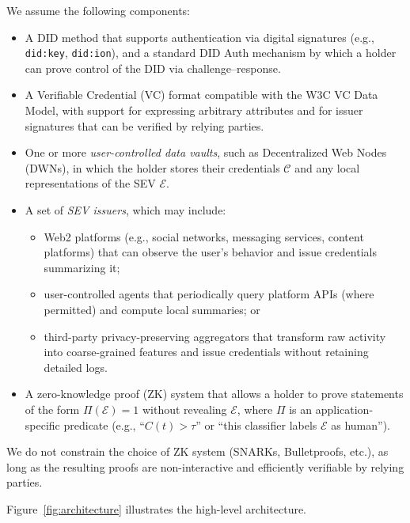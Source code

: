\documentclass[11pt]{article}
\begin{document}
We assume the following components:

\begin{itemize}
  \item A DID method that supports authentication via digital signatures (e.g., \texttt{did:key}, \texttt{did:ion}), and a standard DID Auth mechanism by which a holder can prove control of the DID via challenge--response.
  \item A Verifiable Credential (VC) format compatible with the W3C VC Data Model, with support for expressing arbitrary attributes and for issuer signatures that can be verified by relying parties.
  \item One or more \emph{user-controlled data vaults}, such as Decentralized Web Nodes (DWNs), in which the holder stores their credentials $\mathcal{C}$ and any local representations of the SEV $\mathcal{E}$.
  \item A set of \emph{SEV issuers}, which may include:
  \begin{itemize}
    \item Web2 platforms (e.g., social networks, messaging services, content platforms) that can observe the user's behavior and issue credentials summarizing it;
    \item user-controlled agents that periodically query platform APIs (where permitted) and compute local summaries; or
    \item third-party privacy-preserving aggregators that transform raw activity into coarse-grained features and issue credentials without retaining detailed logs.
  \end{itemize}
  \item A zero-knowledge proof (ZK) system that allows a holder to prove statements of the form $\Pi(\mathcal{E}) = 1$ without revealing $\mathcal{E}$, where $\Pi$ is an application-specific predicate (e.g., ``$C(t) > \tau$'' or ``this classifier labels $\mathcal{E}$ as human'').
\end{itemize}

We do not constrain the choice of ZK system (SNARKs, Bulletproofs, etc.), as long as the resulting proofs are non-interactive and efficiently verifiable by relying parties.

Figure~\ref{fig:architecture} illustrates the high-level architecture.
\end{document}
